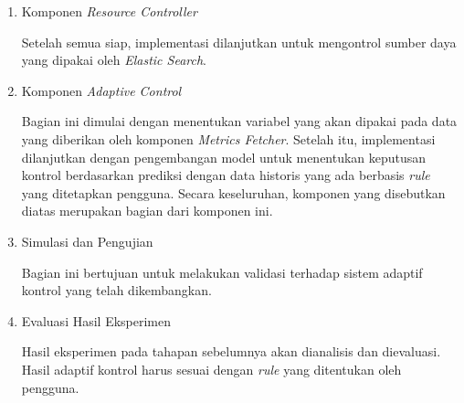 \begin{enumerate}
\begin{enumerate}
        \item Komponen \textit{Resource Controller}
        
        Setelah semua siap, implementasi dilanjutkan untuk mengontrol sumber daya yang dipakai oleh \textit{Elastic Search}.

        \item Komponen \textit{Adaptive Control}
        
        Bagian ini dimulai dengan menentukan variabel yang akan dipakai pada data yang diberikan oleh komponen \textit{Metrics Fetcher}. Setelah itu, implementasi dilanjutkan dengan pengembangan model untuk menentukan keputusan kontrol berdasarkan prediksi dengan data historis yang ada berbasis \textit{rule} yang ditetapkan pengguna. Secara keseluruhan, komponen yang disebutkan diatas merupakan bagian dari komponen ini.

        \item Simulasi dan Pengujian
        
        Bagian ini bertujuan untuk melakukan validasi terhadap sistem adaptif kontrol yang telah dikembangkan.
    
        \item Evaluasi Hasil Eksperimen
        
        Hasil eksperimen pada tahapan sebelumnya akan dianalisis dan dievaluasi. Hasil adaptif kontrol harus sesuai dengan \textit{rule} yang ditentukan oleh pengguna.
    \end{enumerate}
\end{enumerate}
